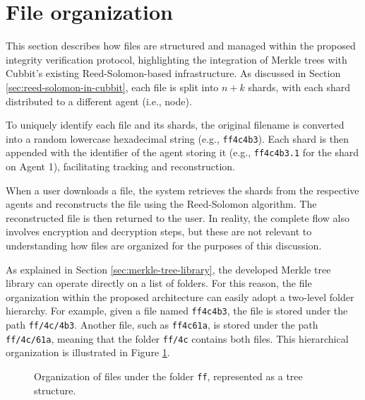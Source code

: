 \section{File organization}

This section describes how files are structured and managed within the proposed integrity verification protocol, highlighting the integration of Merkle trees with Cubbit's existing Reed-Solomon-based infrastructure. As discussed in Section \ref{sec:reed-solomon-in-cubbit}, each file is split into $n+k$ shards, with each shard distributed to a different agent (i.e., node).

To uniquely identify each file and its shards, the original filename is converted into a random lowercase hexadecimal string (e.g., \texttt{ff4c4b3}). Each shard is then appended with the identifier of the agent storing it (e.g., \texttt{ff4c4b3.1} for the shard on Agent 1), facilitating tracking and reconstruction.

When a user downloads a file, the system retrieves the shards from the respective agents and reconstructs the file using the Reed-Solomon algorithm. The reconstructed file is then returned to the user. In reality, the complete flow also involves encryption and decryption steps, but these are not relevant to understanding how files are organized for the purposes of this discussion.

As explained in Section \ref{sec:merkle-tree-library}, the developed Merkle tree library can operate directly on a list of folders. For this reason, the file organization within the proposed architecture can easily adopt a two-level folder hierarchy. For example, given a file named \texttt{ff4c4b3}, the file is stored under the path \texttt{ff/4c/4b3}. Another file, such as \texttt{ff4c61a}, is stored under the path \texttt{ff/4c/61a}, meaning that the folder \texttt{ff/4c} contains both files. This hierarchical organization is illustrated in Figure \ref{fig:file-organization-example-in-tree}.  

\begin{figure}[h]
\centering
{}
\caption{Organization of files under the folder \texttt{ff}, represented as a tree structure.}
\label{fig:file-organization-example-in-tree}
\end{figure}

